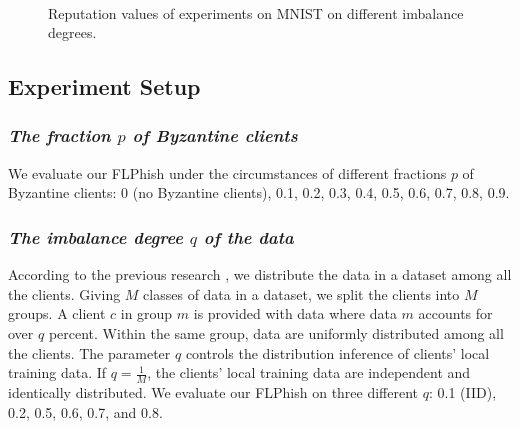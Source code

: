 \documentclass[journal]{IEEEtran}
\begin{document}
\begin{figure}[!htp]
  \\
  \caption{Reputation values of experiments on MNIST on different imbalance degrees.}
  \label{fig_exp_reputation}
  \vspace{0.2in}
\end{figure}


\subsection{Experiment Setup}


  \subsubsection{{\textit{The fraction {$p$} of Byzantine clients}}} We evaluate our FLPhish under the circumstances of different fractions $p$ of Byzantine clients: 0 (no Byzantine clients), 0.1, 0.2, 0.3, 0.4, 0.5, 0.6, 0.7, 0.8, 0.9.
  \subsubsection{{\textit{The imbalance degree {$q$} of the data}}} According to the previous research \cite{ref_06_model}, we distribute the data in a dataset among all the clients. Giving $M$ classes of data in a dataset, we split the clients into $M$ groups. A client $c$ in group $m$ is provided with data where data $m$ accounts for over $q$ percent. Within the same group, data are uniformly distributed among all the clients. The parameter $q$ controls the distribution inference of clients' local training data. If $q=\frac{1}{M}$, the clients' local training data are independent and identically distributed. We evaluate our FLPhish on three different $q$: 0.1 (IID), 0.2, 0.5, 0.6, 0.7, and 0.8.
\end{document}
